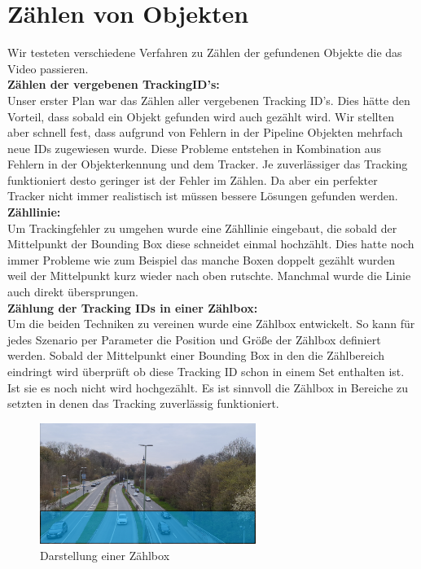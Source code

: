 \documentclass[conference]{IEEEtran}
\begin{document}
	
	\section{Zählen von Objekten}
	Wir testeten verschiedene Verfahren zu Zählen der gefundenen Objekte die das Video passieren.\\
	\textbf{Zählen der vergebenen TrackingID's:}\\
	 Unser erster Plan war das Zählen aller vergebenen Tracking ID's. Dies hätte den Vorteil, dass sobald ein Objekt gefunden wird auch gezählt wird. Wir stellten aber schnell fest, dass aufgrund von Fehlern in der Pipeline Objekten mehrfach neue IDs zugewiesen wurde. Diese Probleme entstehen in Kombination aus Fehlern in der Objekterkennung und dem Tracker. Je zuverlässiger das Tracking funktioniert desto geringer ist der Fehler im Zählen. Da aber ein perfekter Tracker nicht immer realistisch ist müssen bessere Lösungen gefunden werden.\\
	\textbf{Zähllinie:}\\
	 Um Trackingfehler zu umgehen wurde eine Zähllinie eingebaut, die sobald der Mittelpunkt der Bounding Box diese schneidet einmal hochzählt. Dies hatte noch immer Probleme wie zum Beispiel das manche Boxen doppelt gezählt wurden weil der Mittelpunkt kurz wieder nach oben rutschte. Manchmal wurde die Linie auch direkt übersprungen.\\
	\textbf{Zählung der Tracking IDs in einer Zählbox:}\\
	 Um die beiden Techniken zu vereinen wurde eine Zählbox entwickelt. So kann für jedes Szenario per Parameter die Position und Größe der Zählbox definiert werden. Sobald der Mittelpunkt einer Bounding Box in den die Zählbereich eindringt wird überprüft ob diese Tracking ID schon in einem Set enthalten ist. Ist sie es noch nicht wird hochgezählt. Es ist sinnvoll die Zählbox in Bereiche zu setzten in denen das Tracking zuverlässig funktioniert. 
	\begin{figure}[!h]
		\begin{center}
			\includegraphics[width=7cm]{Media/BrudermuhlCounter.png}
			\caption{Darstellung einer Zählbox}
			\label{Counter}
		\end{center}
	\end{figure}
	
\end{document}

